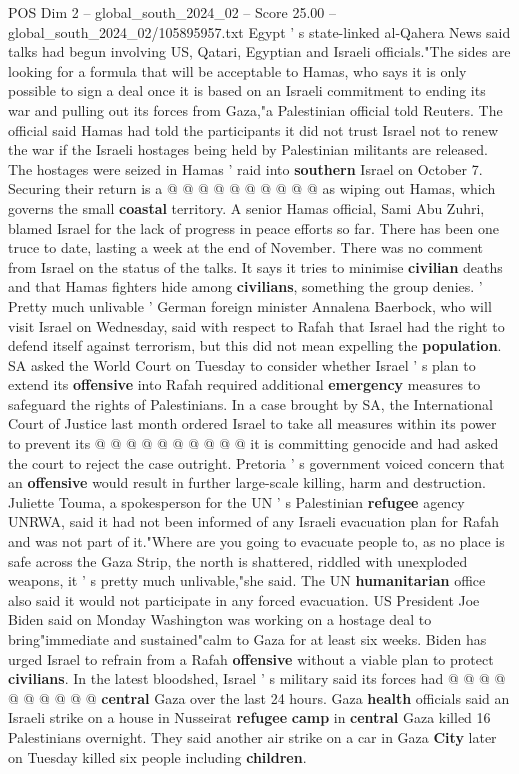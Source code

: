 \begin{textsample}{POS Dim 2 – global\_south\_2024\_02 – Score 25.00 – global\_south\_2024\_02/105895957.txt}
Egypt ' s state-linked al-Qahera News said talks had begun involving US, Qatari, Egyptian and Israeli officials."The sides are looking for a formula that will be acceptable to Hamas, who says it is only possible to sign a deal once it is based on an Israeli commitment to ending its war and pulling out its forces from Gaza,"a Palestinian official told Reuters.
The official said Hamas had told the participants it did not trust Israel not to renew the war if the Israeli hostages being held by Palestinian militants are released.
The hostages were seized in Hamas ' raid into \textbf{southern} Israel on October 7.
Securing their return is a @ @ @ @ @ @ @ @ @ @ as wiping out Hamas, which governs the small \textbf{coastal} territory.
A senior Hamas official, Sami Abu Zuhri, blamed Israel for the lack of progress in peace efforts so far.
There has been one truce to date, lasting a week at the end of November.
There was no comment from Israel on the status of the talks.
It says it tries to minimise \textbf{civilian} deaths and that Hamas fighters hide among \textbf{civilians}, something the group denies. ' Pretty much unlivable ' German foreign minister Annalena Baerbock, who will visit Israel on Wednesday, said with respect to Rafah that Israel had the right to defend itself against terrorism, but this did not mean expelling the \textbf{population}.
SA asked the World Court on Tuesday to consider whether Israel ' s plan to extend its \textbf{offensive} into Rafah required additional \textbf{emergency} measures to safeguard the rights of Palestinians.
In a case brought by SA, the International Court of Justice last month ordered Israel to take all measures within its power to prevent its @ @ @ @ @ @ @ @ @ @ it is committing genocide and had asked the court to reject the case outright.
Pretoria ' s government voiced concern that an \textbf{offensive} would result in further large-scale killing, harm and destruction.
Juliette Touma, a spokesperson for the UN ' s Palestinian \textbf{refugee} agency UNRWA, said it had not been informed of any Israeli evacuation plan for Rafah and was not part of it."Where are you going to evacuate people to, as no place is safe across the Gaza Strip, the north is shattered, riddled with unexploded weapons, it ' s pretty much unlivable,"she said.
The UN \textbf{humanitarian} office also said it would not participate in any forced evacuation.
US President Joe Biden said on Monday Washington was working on a hostage deal to bring"immediate and sustained"calm to Gaza for at least six weeks.
Biden has urged Israel to refrain from a Rafah \textbf{offensive} without a viable plan to protect \textbf{civilians}.
In the latest bloodshed, Israel ' s military said its forces had @ @ @ @ @ @ @ @ @ @ \textbf{central} Gaza over the last 24 hours.
Gaza \textbf{health} officials said an Israeli strike on a house in Nusseirat \textbf{refugee} \textbf{camp} in \textbf{central} Gaza killed 16 Palestinians overnight.
They said another air strike on a car in Gaza \textbf{City} later on Tuesday killed six people including \textbf{children}.


\end{textsample}
